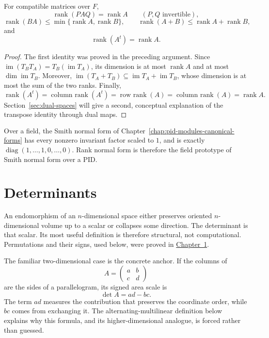 \begin{proposition}\label{prop:basic-rank-identities}
For compatible matrices over \(F\),
\[
\operatorname{rank}(PAQ)=\operatorname{rank}A
\qquad(P,Q\text{ invertible}),
\]
\[
\operatorname{rank}(BA)\leq
\min\{\operatorname{rank}A,\operatorname{rank}B\},
\qquad
\operatorname{rank}(A+B)\leq\operatorname{rank}A+\operatorname{rank}B,
\]
and
\[
\operatorname{rank}(A^t)=\operatorname{rank}A.
\]
\end{proposition}
\begin{proof}
The first identity was proved in the preceding argument.  Since
\(\operatorname{im}(T_BT_A)=T_B(\operatorname{im}T_A)\), its dimension is at
most \(\operatorname{rank}A\) and at most \(\dim\operatorname{im}T_B\).
Moreover,
\(\operatorname{im}(T_A+T_B)\subseteq
\operatorname{im}T_A+\operatorname{im}T_B\),
whose dimension is at most the sum of the two ranks.  Finally,
\[
\operatorname{rank}(A^t)
=\operatorname{column\ rank}(A^t)
=\operatorname{row\ rank}(A)
=\operatorname{column\ rank}(A)
=\operatorname{rank}A.
\]
Section~\ref{sec:dual-spaces} will give a second, conceptual explanation of
the transpose identity through dual maps.
\end{proof}

Over a field, the Smith normal form of
Chapter~\ref{chap:pid-modules-canonical-forms} has every nonzero invariant
factor scaled to \(1\), and is exactly
\(\operatorname{diag}(1,\ldots,1,0,\ldots,0)\).  Rank normal form is therefore
the field prototype of Smith normal form over a PID.

\section{Determinants}\label{sec:determinants}
An endomorphism of an \(n\)-dimensional space either preserves oriented
\(n\)-dimensional volume up to a scalar or collapses some direction. The
determinant is that scalar. Its most useful definition is therefore
structural, not computational. Permutations and their signs, used below, were
proved in \hyperref[chap:groups-foundations]{Chapter~1}.

The familiar two-dimensional case is the concrete anchor.  If the columns
of
\[
A=\begin{pmatrix}a&b\\c&d\end{pmatrix}
\]
are the sides of a parallelogram, its signed area scale is
\[
\det A=ad-bc.
\]
The term \(ad\) measures the contribution that preserves the coordinate
order, while \(bc\) comes from exchanging it.  The alternating-multilinear
definition below explains why this formula, and its higher-dimensional
analogue, is forced rather than guessed.

